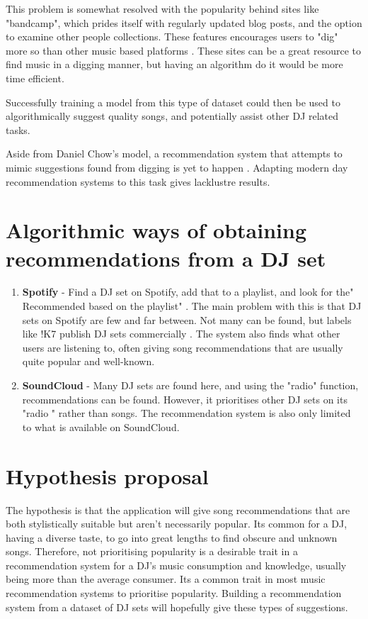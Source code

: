 This problem is somewhat resolved with the popularity behind sites like "bandcamp", which prides itself with regularly updated blog posts, and the option to examine other people collections. These features encourages users to "dig" more so than other music based platforms \citep{bandcamp_about_2023}.  These sites can be a great resource to find music in a digging manner, but having an algorithm do it would be more time efficient. 

Successfully training a model from this type of dataset could then be used to algorithmically suggest quality songs, and potentially assist other DJ related tasks.

Aside from Daniel Chow's model, a recommendation system that attempts to mimic suggestions found from digging is yet to happen \citep{chow_music_2020}. Adapting modern day recommendation systems to this task gives lacklustre results.

\section{Algorithmic ways of obtaining recommendations from a DJ set}
\begin{enumerate}
	\item \textbf{Spotify }- Find a DJ set on Spotify, add that to a playlist, and look for the"
	Recommended based on the playlist" . The main problem with this is that DJ sets on Spotify are few and far between. Not many can be found, but labels like !K7 publish DJ sets commercially \citep{k7_about_2023}. The system also finds what other users are listening to, often giving song recommendations that are usually quite popular and well-known.
	
	\item \textbf{SoundCloud }- Many DJ sets are found here, and using the "radio" function, recommendations can be found. However, it prioritises other DJ sets on its "radio " rather than songs. The recommendation system is also only limited to what is available on SoundCloud.
	
\end{enumerate}

\section{Hypothesis proposal}
	
The hypothesis is that the application will give song recommendations that are both stylistically suitable but aren’t necessarily popular. Its common for a DJ, having a diverse taste, to go into
great lengths to find obscure and unknown songs. Therefore, not prioritising popularity is a
desirable trait in a recommendation system for a DJ’s music consumption and knowledge, usually
being more than the average consumer. Its a common trait in most music recommendation
systems to prioritise popularity. Building a recommendation system from a dataset of DJ sets
will hopefully give these types of suggestions.	

